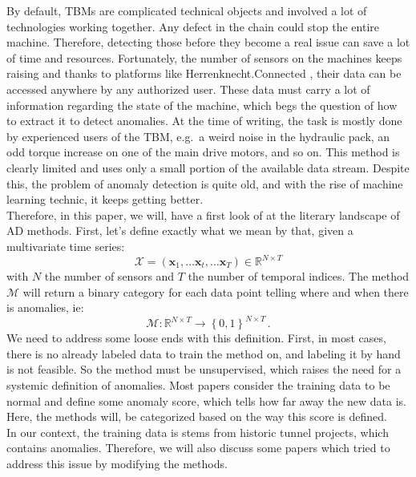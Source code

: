\documentclass[../../main/main.tex]{subfiles}
\begin{document}

    By default, \acp{TBM} are complicated technical objects and involved a lot of technologies working together. Any defect in the chain
    could stop the entire machine. Therefore, detecting those before they become a real issue can save a lot of time and resources. Fortunately, the number
    of sensors on the machines keeps raising and thanks to platforms like Herrenknecht.Connected \cite{HKC.2024}, their data can be accessed anywhere by any authorized user. These data
    must carry a lot of information regarding the state of the machine, which begs the question of how to extract it to detect anomalies. At the time of writing,
    the task is mostly done by experienced users of the \ac{TBM}, e.g.~a weird noise in the hydraulic pack, an odd torque increase on one of the main drive motors,
    and so on. This method is clearly limited and uses only a small portion of the available data stream. Despite this, the problem of anomaly detection is quite
    old, and with the rise of machine learning technic, it keeps getting better. \\
    Therefore, in this paper, we will, have a first look of at the literary landscape of \ac{AD} methods. First, let's define exactly what we mean by that, given a multivariate time series: 
    \begin{equation}
        \mathcal{X} = (\textbf{x}_1, \dots \textbf{x}_t, \dots \textbf{x}_T) \in \mathbb{R}^{N \times T}
    \end{equation}
    with $N$ the number of sensors and $T$ the number of temporal indices. The method $\mathcal{M} $ will return a binary category for each data point 
    telling where and when there is anomalies, ie:
    \begin{equation}
        \mathcal{M} : \mathbb{R}^{N \times T} \to \left\{0, 1\right\} ^{N \times T} \, .
    \end{equation}
    We need to address some loose ends with this definition. First, in most cases, there is no already labeled data to train the method on, and labeling it
    by hand is not feasible. So the method must be unsupervised, which raises the need for a systemic definition of anomalies. Most papers consider the
    training data to be normal and define some anomaly score, which tells how far away the new data is. Here, the methods will, be categorized based on the way
    this score is defined.\\
    In our context, the training data is stems from historic tunnel projects, which contains anomalies. Therefore, we will also discuss some papers which tried to
    address this issue by modifying the methods. 
\end{document}
